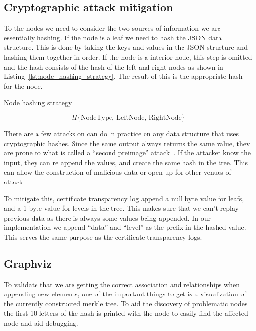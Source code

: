 \documentclass[../Main/thesis.tex]{subfiles}
\begin{document}
\subsection*{Cryptographic attack mitigation}%
\label{sub:mitigate_attack}
To the nodes we need to consider the two sources of information we are
essentially hashing. If the node is a leaf we need to hash the JSON data
structure. This is done by taking the keys and values in the JSON structure and
hashing them together in order. If the node is a interior node, this step is
omitted and the hash consists of the hash of the left and right nodes as shown
in Listing~\ref{lst:node_hashing_strategy}. The result of this is the
appropriate hash for the node.

\begin{listing}[H]
\caption{Node hashing strategy}
\label{lst:node_hashing_strategy}
\begin{equation*}
H\{\text{NodeType},\ \text{LeftNode},\ \text{RightNode}\}
\end{equation*}
\end{listing}

There are a few attacks on can do in practice on any data structure that uses
cryptographic hashes. Since the same output always returns the same value, they
are prone to what is called a ``second preimage'' attack~\cite{rfc4270}. If the
attacker know the input, they can re append the values, and create the same hash
in the tree.  This can allow the construction of malicious data or open up for
other venues of attack.

To mitigate this, certificate transparency log append a null byte value for
leafs, and a 1 byte value for levels in the tree. This makes sure that we can't
replay previous data as there is always some values being appended. In our
implementation we append ``data'' and ``level'' as the prefix in the hashed
value. This serves the same purpose as the certificate transparency logs.


\subsection*{Graphviz}%
\label{sub:graph_merkle_tree}
To validate that we are getting the correct association and relationships when
appending new elements, one of the important things to get is a visualization of
the currently constructed merkle tree. To aid the discovery of problematic nodes
the first 10 letters of the hash is printed with the node to easily find the
affected node and aid debugging.
\end{document}

